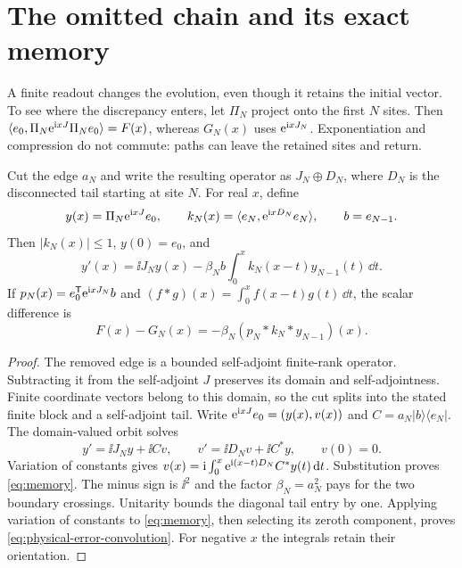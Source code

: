 \section{The omitted chain and its exact memory}
\label{sec:memory}

A finite readout changes the evolution, even though it retains the
initial vector. To see where the discrepancy enters, let \(\Pi_N\)
project onto the first \(N\) sites. Then
\(\langle e_0,\Pi_N\mathrm e^{\mathrm i xJ}\Pi_Ne_0\rangle=F(x)\), whereas
\(G_N(x)\) uses \(\mathrm e^{\mathrm i xJ_N}\). Exponentiation and compression
do not commute: paths can leave the retained sites and return.

\begin{proposition}
\label{prop:memory}
Cut the edge \(a_N\) and write the resulting operator as
\(J_N\oplus D_N\), where \(D_N\) is the disconnected tail starting
at site \(N\). For real \(x\), define
\[
 y(x)=\Pi_N\mathrm e^{\mathrm i xJ}e_0,\qquad
 k_N(x)=\langle e_N,\mathrm e^{\mathrm i xD_N}e_N\rangle,\qquad b=e_{N-1}.
\]
Then \(|k_N(x)|\le1\), \(y(0)=e_0\), and
\begin{equation}
 y'(x)=\ii J_Ny(x)-\beta_Nb
       \int_0^x k_N(x-t)y_{N-1}(t)\,\dd t.
 \label{eq:memory}
\end{equation}
If \(p_N(x)=e_0^{\mathsf T}\mathrm e^{\mathrm i xJ_N}b\) and
\((f*g)(x)=\int_0^x f(x-t)g(t)\,\dd t\), the scalar difference is
\begin{equation}
 F(x)-G_N(x)=-\beta_N(p_N*k_N*y_{N-1})(x).
 \label{eq:physical-error-convolution}
\end{equation}
\end{proposition}

\begin{proof}
The removed edge is a bounded self-adjoint finite-rank operator.
Subtracting it from the self-adjoint \(J\) preserves its domain
and self-adjointness. Finite coordinate vectors belong to this domain,
so the cut splits into the stated finite block and a self-adjoint tail.
Write \(\mathrm e^{\mathrm i xJ}e_0=(y(x),v(x))\) and
\(C=a_N|b\rangle\langle e_N|\). The domain-valued orbit solves
\[
 y'=\ii J_Ny+\ii Cv,\qquad v'=\ii D_Nv+\ii C^*y,
 \qquad v(0)=0.
\]
Variation of constants gives
\(v(x)=\mathrm i\int_0^x\mathrm e^{\mathrm i(x-t)D_N}C^*y(t)\,\mathrm d t\).
Substitution proves \eqref{eq:memory}. The minus sign is \(\ii^2\)
and the factor \(\beta_N=a_N^2\) pays for the two boundary crossings.
Unitarity bounds the diagonal tail entry by one. Applying variation
of constants to \eqref{eq:memory}, then selecting its zeroth component,
proves \eqref{eq:physical-error-convolution}. For negative \(x\)
the integrals retain their orientation.
\end{proof}


